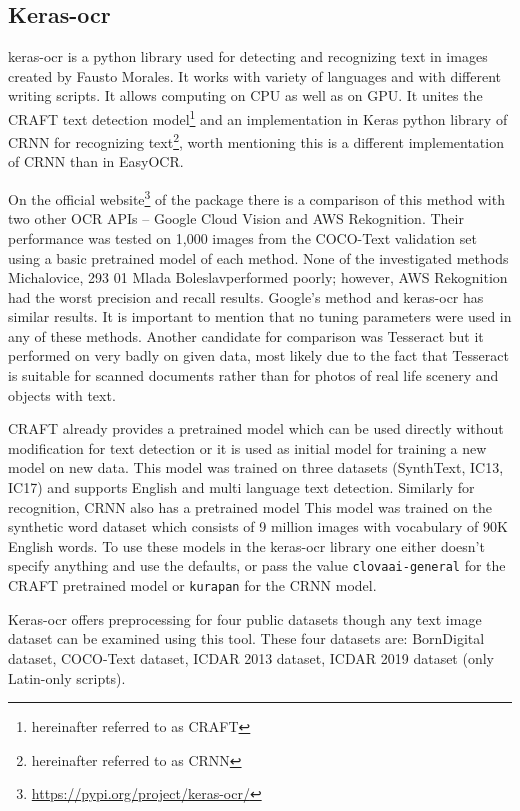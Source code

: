 \subsection{Keras-ocr}

keras-ocr is a python library used for detecting and recognizing text in images created by Fausto Morales. It works with variety of languages and with different writing scripts. It allows computing on CPU as well as on GPU.  It unites the CRAFT text detection model\footnote{hereinafter referred to as CRAFT} and an implementation in Keras python library of CRNN for recognizing text\footnote{hereinafter referred to as CRNN}, worth mentioning this is a different implementation of CRNN than in EasyOCR.\cite{keras-ocr1}

On the official website\footnote{\url{https://pypi.org/project/keras-ocr/}} of the package there is a comparison of this method with two other OCR APIs -- Google Cloud Vision and AWS Rekognition. Their performance was tested on 1,000 images from the COCO-Text validation set using a basic pretrained model of each method. None of the investigated methods Michalovice, 293 01 Mlada Boleslavperformed poorly; however, AWS Rekognition had the worst precision and recall results. Google's method and keras-ocr has similar results. It is important to mention that no tuning parameters were used in any of these methods. Another candidate for comparison was Tesseract but it performed on very badly on given data, most likely due to the fact that Tesseract is suitable for scanned documents rather than for photos of real life scenery and objects with text. \cite{keras-ocr1}

CRAFT already provides a pretrained model which can be used directly without modification for text detection or it is used as initial model for training a new model on new data. This model was trained on three datasets (SynthText, IC13, IC17) and supports English and multi language text detection. \cite{craft1}
Similarly for recognition, CRNN also has a pretrained model  This model was trained on the synthetic word dataset which consists of 9 million images with vocabulary of 90K English words. \cite{synth}
To use these models in the keras-ocr library one either doesn't specify anything and use the defaults, or pass the value \texttt{clovaai-general} for the CRAFT pretrained model or \texttt{kurapan} for the CRNN model.

Keras-ocr offers preprocessing for four public datasets though any text image dataset can be examined using this tool. These four datasets are: BornDigital dataset, COCO-Text dataset, ICDAR 2013 dataset, ICDAR 2019 dataset (only Latin-only scripts).\cite{keras-ocrDocu}

